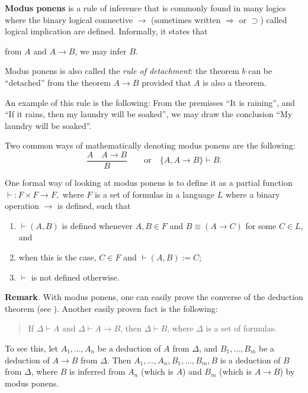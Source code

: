 \documentclass[12pt]{article}
\begin{document}
\textbf{Modus ponens} is a rule of inference that is commonly found in many logics where the binary logical connective $\to$ (sometimes written $\Rightarrow$ or $\supset$) called logical implication are defined.  Informally, it states that 

\begin{center}
from $A$ and $A \to B$, we may infer $B$.
\end{center}

Modus ponens is also called the \emph{rule of detachment}: the theorem $b$ can be ``detached'' from the theorem $A \to B$ provided that $A$ is also a theorem.

An example of this rule is the following:  From the premisses ``It is raining'',
and ``If it rains, then my laundry will be soaked'', we may draw the conclusion 
``My laundry will be soaked''.

Two common ways of mathematically denoting modus ponens are the following:
$$\frac{A \quad A \to B}{B} \qquad \mbox{or} \quad \lbrace A, A \to B\rbrace \vdash B.$$

One formal way of looking at modus ponens is to define it as a partial function $\vdash : F \times F \to F,$ where $F$ is a set of formulas in a language $L$ where a binary operation $\to$ is defined, such that 
\begin{enumerate}
\item
$\vdash(A, B)$ is defined whenever $A, B \in F$ and $B \equiv (A \to C)$ for some $C \in L$, and
\item
when this is the case, $C \in F$ and $\vdash(A, B) := C$;
\item
$\vdash$ is not defined otherwise.
\end{enumerate}

\textbf{Remark}.  With modus ponens, one can easily prove the converse of the deduction theorem (see ).  Another easily proven fact is the following: 
\begin{quote}\begin{center}
If $\Delta \vdash A$ and $\Delta\vdash A\to B$, then $\Delta \vdash B$, where $\Delta$ is a set of formulas.
\end{center}\end{quote}
To see this, let $A_1,\ldots, A_n$ be a deduction of $A$ from $\Delta$, and $B_1,\ldots, B_m$ be a deduction of $A\to B$ from $\Delta$.  Then $A_1,\ldots, A_n, B_1,\ldots, B_m, B$ is a deduction of $B$ from $\Delta$, where $B$ is inferred from $A_n$ (which is $A$) and $B_m$ (which is $A\to B$) by modus ponens.
\end{document}
